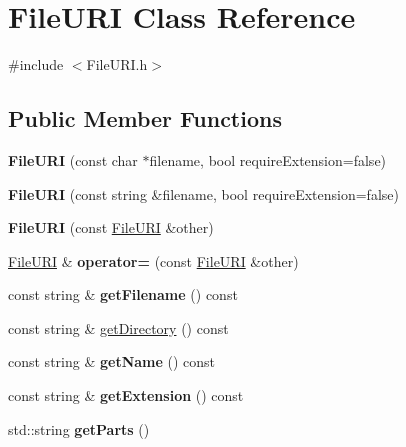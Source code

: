 \hypertarget{classFileURI}{}\section{File\+U\+RI Class Reference}
\label{classFileURI}


{\ttfamily \#include $<$File\+U\+R\+I.\+h$>$}

\subsection*{Public Member Functions}
\begin{DoxyCompactItemize}
\item 
\mbox{\label{classFileURI_ae2216dec8474130ed9fdf7821b2010e7}} 
{\bfseries File\+U\+RI} (const char $\ast$filename, bool require\+Extension=false)
\item 
\mbox{\label{classFileURI_a5bbda26701eea6497f5f627bac77bcad}} 
{\bfseries File\+U\+RI} (const string \&filename, bool require\+Extension=false)
\item 
\mbox{\label{classFileURI_a6d360fe34e94d6515e7a07f7e920a9f1}} 
{\bfseries File\+U\+RI} (const \mbox{\hyperlink{classFileURI}{File\+U\+RI}} \&other)
\item 
\mbox{\label{classFileURI_a568a7411f03e979c0c3600a4839fb5fd}} 
\mbox{\hyperlink{classFileURI}{File\+U\+RI}} \& {\bfseries operator=} (const \mbox{\hyperlink{classFileURI}{File\+U\+RI}} \&other)
\item 
\mbox{\label{classFileURI_a466f394fd9af0583935fc5d6a9ce2f9a}} 
const string \& {\bfseries get\+Filename} () const
\item 
const string \& \mbox{\hyperlink{classFileURI_a9423995d29f27b5032c7061f4ea207f0}{get\+Directory}} () const
\item 
\mbox{\label{classFileURI_a25bedd1ea4fa0737575da47b25e71375}} 
const string \& {\bfseries get\+Name} () const
\item 
\mbox{\label{classFileURI_a6f16821c565883105347f57d1b9dcd3f}} 
const string \& {\bfseries get\+Extension} () const
\item 
\mbox{\label{classFileURI_a0ed4a05918105050d5383c113484a550}} 
std\+::string {\bfseries get\+Parts} ()
\end{DoxyCompactItemize}
